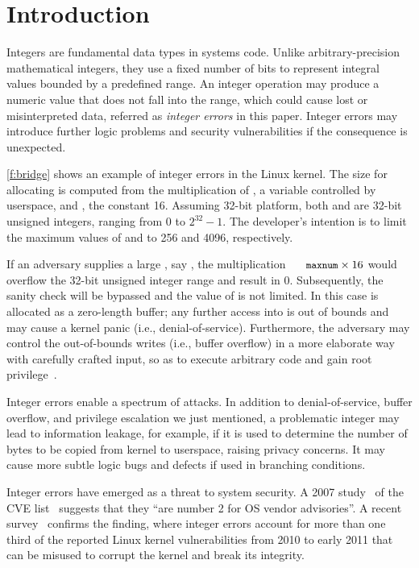 \section{Introduction}
\label{s:intro}

Integers are fundamental data types in systems code.  Unlike
arbitrary-precision mathematical integers, they use a fixed number
of bits to represent integral values bounded by a predefined range.
An integer operation may produce a numeric value that does not fall
into the range, which could cause lost or misinterpreted data, referred
as \emph{integer errors} in this paper.  Integer errors may introduce
further logic problems and security vulnerabilities if the consequence
is unexpected.

\autoref{f:bridge} shows an example of integer errors in the Linux
kernel.  The size for allocating  is computed from the
multiplication of , a variable controlled by userspace,
and , the constant 16.  Assuming
32-bit platform, both  and  are 32-bit unsigned
integers, ranging from 0 to $2^{32} - 1$.
The developer's intention is to limit the maximum values of 
 and  to 256 and 4096, respectively.

If an adversary supplies a large , say ,
the multiplication $\cc{maxnum} \times 16$ would overflow the 32-bit
unsigned integer range and result in 0.  Subsequently, the sanity
check will be bypassed and the value of  is not limited.
In this case  is allocated as a zero-length buffer; any
further access into  is out of bounds and may cause a kernel
panic (i.e., denial-of-service).  Furthermore, the adversary
may control the out-of-bounds writes (i.e., buffer overflow) in a
more elaborate way with carefully crafted input, so as to execute
arbitrary code and gain root privilege~\cite[CVE-2006-5751]{cve}.

Integer errors enable a spectrum of attacks.  In addition to
denial-of-service, buffer overflow, and privilege escalation we
just mentioned, a problematic integer may lead to information
leakage, for example, if it is used to determine the number of bytes
to be copied from kernel to userspace, raising privacy concerns.
It may cause more subtle logic bugs and defects if used in branching
conditions.

Integer errors have emerged as a threat to system security.  A 2007
study~\cite{christey:vuln} of the CVE list~\cite{cve} suggests that
they ``are number 2 for OS vendor advisories''.  A recent
survey~\cite{chen:kbugs} confirms the finding, where integer errors
account for more than one third of the reported Linux kernel
vulnerabilities from 2010 to early 2011 that can be misused to
corrupt the kernel and break its integrity.

